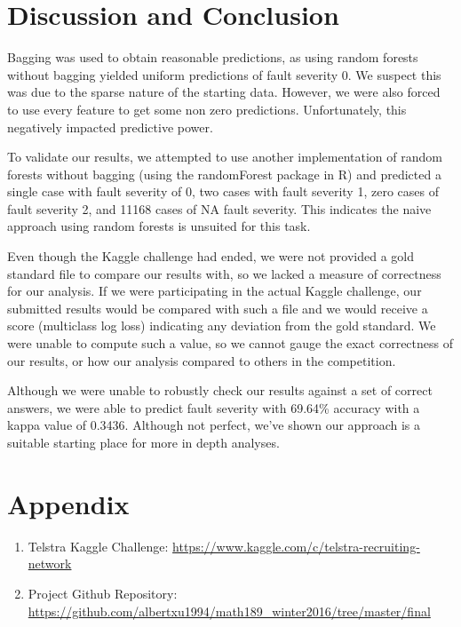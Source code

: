 \documentclass[11pt]{article} %
\begin{document}
\section*{Discussion and Conclusion}
Bagging was used to obtain reasonable predictions, as using random forests without bagging yielded uniform predictions of fault severity 0. We suspect this was due to the sparse nature of the starting data. However, we were also forced to use every feature to get some non zero predictions. Unfortunately, this negatively impacted predictive power.

To validate our results, we attempted to use another implementation of random forests without bagging (using the randomForest package in R) and predicted a single case with fault severity of 0, two cases with fault severity 1, zero cases of fault severity 2, and 11168 cases of NA fault severity. This indicates the naive approach using random forests is unsuited for this task.

Even though the Kaggle challenge had ended, we were not provided a gold standard file to compare our results with, so we lacked a measure of correctness for our analysis. If we were participating in the actual Kaggle challenge, our submitted results would be compared with such a file and we would receive a score (multiclass log loss) indicating any deviation from the gold standard. We were unable to compute such a value, so we cannot gauge the exact correctness of our results, or how our analysis compared to others in the competition.

Although we were unable to robustly check our results against a set of correct answers, we were able to predict fault severity with 69.64\% accuracy with a kappa value of 0.3436. Although not perfect, we’ve shown our approach is a suitable starting place for more in depth analyses.

\section*{Appendix}
\begin{enumerate}
\item Telstra Kaggle Challenge: \url{https://www.kaggle.com/c/telstra-recruiting-network}
\item Project Github Repository: \url{https://github.com/albertxu1994/math189_winter2016/tree/master/final}
\end{enumerate}
\end{document}
